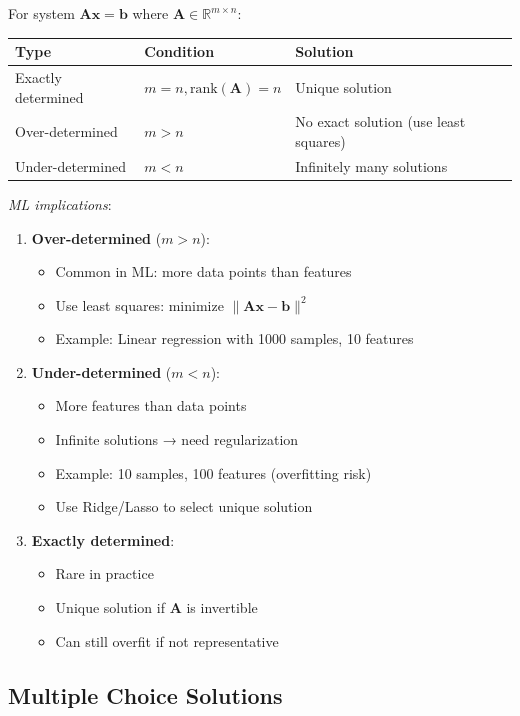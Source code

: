 \documentclass[12pt,a4paper]{article}
\theoremstyle{definition}
\begin{document}
For system $\mathbf{Ax} = \mathbf{b}$ where $\mathbf{A} \in \mathbb{R}^{m \times n}$:

\begin{center}
\begin{tabular}{lll}
\hline
Type & Condition & Solution \\
\hline
Exactly determined & $m = n, \text{rank}(\mathbf{A}) = n$ & Unique solution \\
Over-determined & $m > n$ & No exact solution (use least squares) \\
Under-determined & $m < n$ & Infinitely many solutions \\
\hline
\end{tabular}
\end{center}

\textit{ML implications}:

\begin{enumerate}
\item \textbf{Over-determined} ($m > n$): 
\begin{itemize}
\item Common in ML: more data points than features
\item Use least squares: minimize $\|\mathbf{Ax} - \mathbf{b}\|^2$
\item Example: Linear regression with 1000 samples, 10 features
\end{itemize}

\item \textbf{Under-determined} ($m < n$):
\begin{itemize}
\item More features than data points
\item Infinite solutions → need regularization
\item Example: 10 samples, 100 features (overfitting risk)
\item Use Ridge/Lasso to select unique solution
\end{itemize}

\item \textbf{Exactly determined}:
\begin{itemize}
\item Rare in practice
\item Unique solution if $\mathbf{A}$ is invertible
\item Can still overfit if not representative
\end{itemize}
\end{enumerate}

\subsection{Multiple Choice Solutions}
\end{document}
